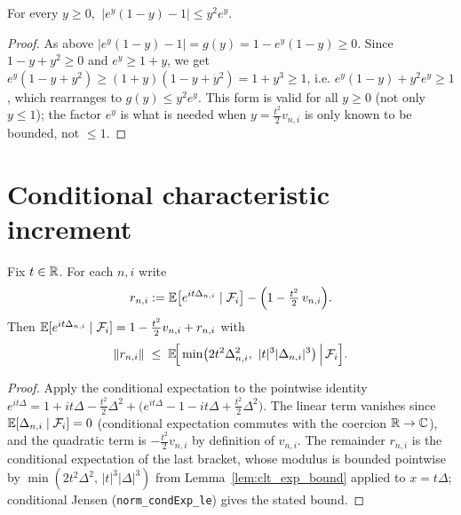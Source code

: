\begin{lemma}\label{lem:clt_real_exp_bound_pos}
\leanok
For every $y\ge0$, $\ \big|e^{y}(1-y)-1\big|\le y^2 e^{y}$.
\end{lemma}

\begin{proof}\leanok
As above $\big|e^{y}(1-y)-1\big|=g(y)=1-e^{y}(1-y)\ge0$. Since $1-y+y^2\ge0$ and
$e^{y}\ge1+y$, we get $e^{y}(1-y+y^2)\ge(1+y)(1-y+y^2)=1+y^3\ge1$, i.e.
$e^{y}(1-y)+y^2e^{y}\ge1$, which rearranges to $g(y)\le y^2 e^{y}$. This form is
valid for all $y\ge0$ (not only $y\le1$); the factor $e^{y}$ is what is needed when
$y=\tfrac{t^2}{2}v_{n,i}$ is only known to be bounded, not $\le1$.
\end{proof}

\section{Conditional characteristic increment}
\label{sec:pre_clt_cond}

\begin{lemma}\label{lem:clt_cond_char}
\leanok
{}
Fix $t\in\mathbb{R}$. For each $n,i$ write
\[
  r_{n,i} := \mathbb{E}\big[e^{it\Delta_{n,i}}\mid\mathcal{F}_i\big]
             - \Big(1 - \tfrac{t^2}{2}\,v_{n,i}\Big).
\]
Then $\mathbb{E}[e^{it\Delta_{n,i}}\mid\mathcal{F}_i] = 1 - \tfrac{t^2}{2}v_{n,i} + r_{n,i}$
with
\[
  \|r_{n,i}\| \;\le\;
  \mathbb{E}\!\Big[\min\!\big(2t^2\Delta_{n,i}^2,\ |t|^3|\Delta_{n,i}|^3\big)
    \,\Big|\,\mathcal{F}_i\Big].
\]
\end{lemma}

\begin{proof}\leanok
{}
Apply the conditional expectation to the pointwise identity
$e^{it\Delta} = 1 + it\Delta - \tfrac{t^2}{2}\Delta^2
 + \big(e^{it\Delta}-1-it\Delta+\tfrac{t^2}{2}\Delta^2\big)$. The linear term
vanishes since $\mathbb{E}[\Delta_{n,i}\mid\mathcal{F}_i]=0$ (conditional expectation commutes
with the coercion $\mathbb{R}\to\mathbb{C}$), and the quadratic term is $-\tfrac{t^2}{2}v_{n,i}$ by
definition of $v_{n,i}$. The remainder $r_{n,i}$ is the conditional expectation of
the last bracket, whose modulus is bounded pointwise by
$\min(2t^2\Delta^2,\,|t|^3|\Delta|^3)$ from Lemma~\ref{lem:clt_exp_bound} applied to
$x=t\Delta$; conditional Jensen (\texttt{norm\_condExp\_le}) gives the stated bound.
\end{proof}

